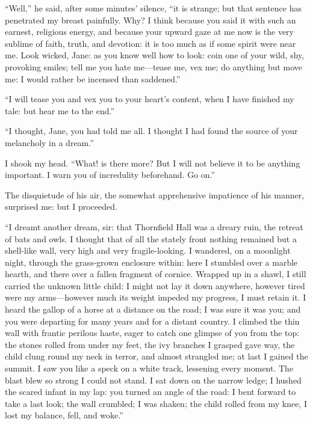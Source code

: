 \enquote{Well,} he said, after some minutes' silence, \enquote{it is
	strange; but that sentence has penetrated my breast painfully.  Why?  I
	think because you said it with such an earnest, religious energy, and
	because your upward gaze at me now is the very sublime of faith, truth,
	and devotion: it is too much as if some spirit were near me.  Look
	wicked, Jane: as you know well how to look: coin one of your wild, shy,
	provoking smiles; tell me you hate me---tease me, vex me; do anything
	but move me: I would rather be incensed than saddened.}

\enquote{I will tease you and vex you to your heart's content, when I
	have finished my tale: but hear me to the end.}

\enquote{I thought, Jane, you had told me all.  I thought I had found
	the source of your melancholy in a dream.}

I shook my head.  \enquote{What! is there more?  But I will not believe
	it to be anything important.  I warn you of incredulity beforehand.  Go
	on.}

The disquietude of his air, the somewhat apprehensive impatience of his
manner, surprised me: but I proceeded.

\enquote{I dreamt another dream, sir: that Thornfield Hall was a dreary
	ruin, the retreat of bats and owls.  I thought that of all the stately
	front nothing remained but a shell-like wall, very high and very
	fragile-looking.  I wandered, on a moonlight night, through the
	grass-grown enclosure within: here I stumbled over a marble hearth, and
	there over a fallen fragment of cornice.  Wrapped up in a shawl, I still
	carried the unknown little child: I might not lay it down anywhere,
	however tired were my arms---however much its weight impeded my
	progress, I must retain it.  I heard the gallop of a horse at a distance
	on the road; I was sure it was you; and you were departing for many
	years and for a distant country.  I climbed the thin wall with frantic
	perilous haste, eager to catch one glimpse of you from the top: the
	stones rolled from under my feet, the ivy branches I grasped gave way,
	the child clung round my neck in terror, and almost strangled me; at
	last I gained the summit.  I saw you like a speck on a white track,
	lessening every moment.  The blast blew so strong I could not stand.  I
	sat down on the narrow ledge; I hushed the scared infant in my lap: you
	turned an angle of the road: I bent forward to take a last look; the
	wall crumbled; I was shaken; the child rolled from my knee, I lost my
	balance, fell, and woke.}

